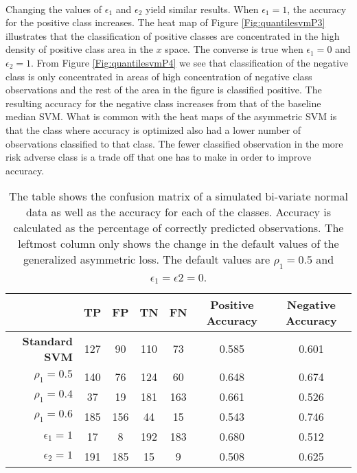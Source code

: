 \\Changing the values of $\epsilon_1$ and $\epsilon_2$ yield similar results. When $\epsilon_1=1$, the accuracy for the positive class increases. The heat map of Figure \ref{Fig:quantilesvmP3} illustrates that the classification of positive classes are concentrated in the high density of positive class area in the $x$ space. The converse is true when $\epsilon_1=0$ and $\epsilon_2=1$. From Figure \ref{Fig:quantilesvmP4} we see that classification of the negative class is only concentrated in areas of high concentration of negative class observations and the rest of the area in the figure is classified positive. The resulting accuracy for the negative class increases from that of the baseline median SVM. What is common with the heat maps of the asymmetric SVM is that the class where accuracy is optimized also had a lower number of observations classified to that class. The fewer classified observation in the more risk adverse class is a trade off that one has to make in order to improve accuracy.


\begin{table}[htp]\label{simulatedsvmtable}

\begin{tabular}{r|cccccc}

\hline
           &   {\bf TP} &   {\bf FP} &   {\bf TN} &   {\bf FN} & {\bf Positive Accuracy} & {\bf Negative Accuracy} \\
\hline
\hline
{\bf Standard SVM} &        127 &         90 &        110 &         73 &      0.585 &      0.601 \\

{\bf $\rho_1=0.5$} &        140 &         76 &        124 &         60 &      0.648 &      0.674 \\

{\bf $\rho_1=0.4$} &         37 &         19 &        181 &        163 &      0.661 &      0.526 \\

{\bf $\rho_1=0.6$} &        185 &        156 &         44 &         15 &      0.543 &      0.746 \\

{\bf $\epsilon_1=1$} &         17 &          8 &        192 &        183 &      0.680 &      0.512 \\

{\bf $\epsilon_2=1$} &        191 &        185 &         15 &          9 &      0.508 &      0.625 \\
\hline
\hline
\end{tabular}
\caption{The table shows the confusion matrix of a simulated bi-variate normal data as well as the accuracy for each of the classes. Accuracy is calculated as the percentage of correctly predicted observations. The leftmost column only shows the change in the default values of the generalized asymmetric loss. The default values are $\rho_1=0.5$ and $\epsilon_1=\epsilon2=0$.}
\end{table}

